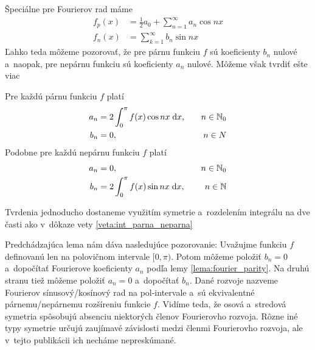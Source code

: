 Špeciálne pre Fourierov rad máme
\begin{align*}
    f_p(x) &= \frac{1}{2} a_0 + \sum_{n=1}^{\infty} a_n \cos n x \\
    f_n(x) &= \sum_{k=1}^{\infty} b_n \sin n x
\end{align*}
Ľahko teda môžeme pozorovať, že pre párnu funkciu $f$ sú koeficienty
$b_n$ nulové a~naopak, pre nepárnu funkciu sú koeficienty $a_n$
nulové. Môžeme však tvrdiť ešte viac
\begin{lema}
    Pre každú párnu funkciu $f$ platí
    \begin{align*}
        a_n &= 2 \int_0^{\pi} f(x) \cos n x \; \mathrm{d} x, \quad & n \in \mathbb{N}_0 \\
        b_n &= 0, \quad& n\in N
    \end{align*}
    Podobne pre každú nepárnu funkciu $f$ platí
    \begin{align*}
        a_n &= 0, \quad& n\in \mathbb{N}_0 \\
        b_n &= 2 \int_0^{\pi} f(x) \sin n x \; \mathrm{d} x, \quad & n \in \mathbb{N}
    \end{align*}
    \label{lema:fourier_parity}
\end{lema}
\begin{dokaz}
    Tvrdenia jednoducho dostaneme využitím symetrie a~rozdelením
    integrálu na dve časti ako v~dôkaze vety \ref{veta:int_parna_neparna}
\end{dokaz}
Predchádzajúca lema nám dáva nasledujúce pozorovanie: Uvažujme funkciu $f$ 
definovanú len na polovičnom intervale $[0,\pi)$. Potom môžeme
položiť $b_n=0$ a~dopočítať Fourierove koeficienty $a_n$ podľa lemy
\ref{lema:fourier_parity}. Na druhú stranu tiež môžeme položiť
$a_n=0$ a~dopočítať $b_n$. Dané rozvoje nazveme Fourierov
sínusový/kosínový rad na pol-intervale a~sú ekvivalentné párnemu/nepárnemu
rozšíreniu funkcie $f$. Vidíme teda, že osová a~stredová symetria
spôsobujú absenciu niektorých členov Fourierovho rozvoja. Rôzne iné typy
symetrie určujú zaujímavé závislosti medzi členmi Fourierovho rozvoja,
ale v~tejto publikácii ich necháme nepreskúmané.

